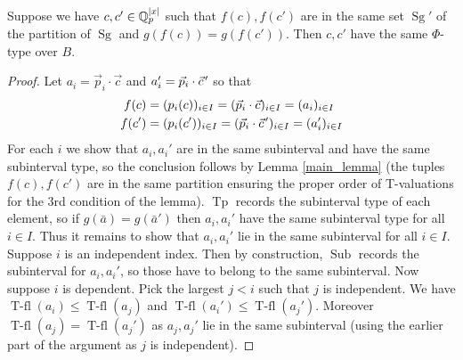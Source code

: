 \documentclass{amsart}
\DeclareMathOperator{\Sg}{Sg}
\DeclareMathOperator{\It}{Tp}
\DeclareMathOperator{\Sub}{Sub}
\DeclareMathOperator{\tfl}{T-fl}
\begin{document}
\begin{Lemma}
  Suppose we have $c, c' \in \mathbb{Q}_p^{|x|}$ such that $f(c), f(c')$ are in the same
  set $\Sg'$ of the partition of $\Sg$ and $g(f(c)) = g(f(c'))$.
  Then $c, c'$ have the same $\Phi$-type over $B$.
\end{Lemma}

\newcommand{\pvec}[1]{\vec{#1}\mkern2mu\vphantom{#1}}

\begin{proof}
  Let $a_i = \vec p_i \cdot \vec c$ and $a_i' = \vec p_i \cdot \pvec c'$ so that
  \begin{align*}
    f(c) &= (p_i(c))_{i \in I} = (\vec p_i \cdot \vec c)_{i \in I} = (a_i)_{i \in I} \\
    f(c') &= (p_i(c'))_{i \in I} = (\vec p_i \cdot \pvec c')_{i \in I} = (a_i')_{i \in I}
  \end{align*}
  For each $i$ we show that $a_i, a_i'$ are in the same subinterval and have the same subinterval type,
  so the conclusion follows by Lemma \ref{main_lemma}
  (the tuples $f(c), f(c')$ are in the same partition ensuring the proper order of T-valuations for the 3rd condition of the lemma).
  $\It$ records the subinterval type of each element, so if $g(\bar a) = g(\bar a')$ then $a_i, a_i'$ have the same subinterval type for all $i \in I$.
  Thus it remains to show that $a_i, a_i'$ lie in the same subinterval for all $i \in I$.
  Suppose $i$ is an independent index.
  Then by construction, $\Sub$ records the subinterval for $a_i, a_i'$, so those have to belong to the same subinterval.
  Now suppose $i$ is dependent.
  Pick the largest $j < i$ such that $j$ is independent.
  We have $\tfl(a_i) \leq \tfl(a_j)$ and $\tfl(a_i') \leq \tfl(a_j')$.
  Moreover $\tfl(a_j) = \tfl(a_j')$ as $a_j, a_j'$ lie in the same subinterval (using the earlier part of the argument as $j$ is independent).
  

\end{proof}
\end{document}
